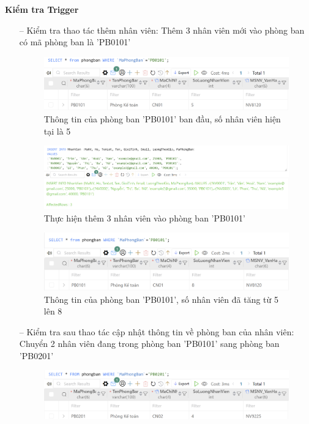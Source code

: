 \newpage
\textbf{Kiểm tra Trigger}
\begin{itemize}
    \item [--] Kiểm tra thao tác thêm nhân viên: Thêm 3 nhân viên mới vào phòng ban có mã phòng ban là 'PB0101'
    \begin{figure}[H]
        \centering
        \includegraphics[width=\linewidth]{content/images/trigger_1_1.png}
        \caption{Thông tin của phòng ban 'PB0101' ban đầu, số nhân viên hiện tại là 5}
        \label{fig:trigger_1_1}
    \end{figure}
    \begin{figure}[H]
        \centering
        \includegraphics[width=\linewidth]{content/images/trigger_1_2.png}
        \caption{Thực hiện thêm 3 nhân viên vào phòng ban 'PB0101'}
        \label{fig:trigger_1_2}
    \end{figure}
    \begin{figure}[H]
        \centering
        \includegraphics[width=\linewidth]{content/images/trigger_1_3.png}
        \caption{Thông tin của phòng ban 'PB0101', số nhân viên đã tăng từ 5 lên 8}
        \label{fig:trigger_1_3}
    \end{figure}
    \item [--] Kiểm tra sau thao tác cập nhật thông tin về phòng ban của nhân viên: Chuyển 2 nhân viên đang trong phòng ban 'PB0101' sang phòng ban 'PB0201'
    \begin{figure}[H]
        \centering
        \includegraphics[width=\linewidth]{content/images/trigger_1_4.png}

\end{figure}
\end{itemize}
